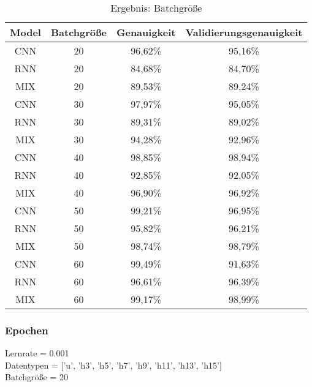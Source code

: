         \begin{table}[H]
            \centering
            \begin{tabular}{|c|c|c|c|}
                \hline
                Model & Batchgröße & Genauigkeit & Validierungsgenauigkeit \\
                \hline
                CNN & 20 & 96,62\% & 95,16\% \\
                \hline
                RNN & 20 & 84,68\% & 84,70\% \\ 
                \hline
                MIX & 20 & 89,53\% & 89,24\% \\ 
                \hline
                \hline
                CNN & 30 & 97,97\% & 95,05\% \\ 
                \hline
                RNN & 30 & 89,31\% & 89,02\% \\ 
                \hline
                MIX & 30 & 94,28\% & 92,96\% \\ 
                \hline
                \hline
                CNN & 40 & 98,85\% & 98,94\% \\ 
                \hline
                RNN & 40 & 92,85\% & 92,05\% \\
                \hline
                MIX & 40 & 96,90\% & 96,92\% \\ 
                \hline
                \hline
                CNN & 50 & 99,21\% & 96,95\% \\ 
                \hline
                RNN & 50 & 95,82\% & 96,21\% \\ 
                \hline
                MIX & 50 & 98,74\% & 98,79\% \\ 
                \hline
                \hline
                CNN & 60 & 99,49\% & 91,63\% \\ 
                \hline
                RNN & 60 & 96,61\% & 96,39\% \\ 
                \hline
                MIX & 60 & 99,17\% & 98,99\% \\
                \hline
            \end{tabular}
            \caption{Ergebnis: Batchgröße}
            \label{tabl:ErgebnisBatchsize}
        \end{table}

    \subsubsection{Epochen}

        Lernrate = 0.001\\
        \noindent
        Datentypen = ['u', 'h3', 'h5', 'h7', 'h9', 'h11', 'h13', 'h15']\\
        \noindent
        Batchgröße = 20\\

